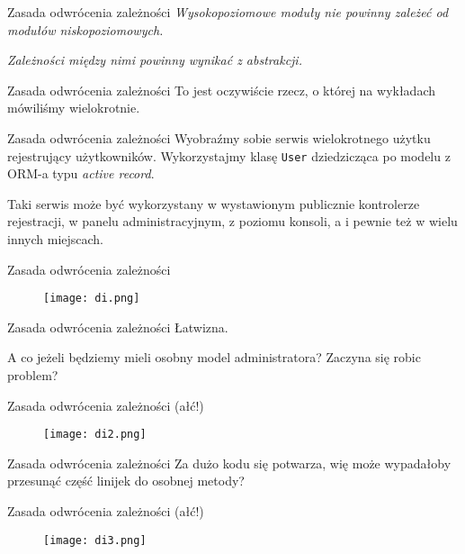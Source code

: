 \begin{frame}{Zasada odwrócenia zależności}
	\emph{Wysokopoziomowe moduły nie powinny zależeć od modułów niskopoziomowych.}
	
	\emph{Zależności między nimi powinny wynikać z abstrakcji.}
\end{frame}

\begin{frame}{Zasada odwrócenia zależności}
	To jest oczywiście rzecz, o której na wykładach mówiliśmy wielokrotnie.
\end{frame}

\begin{frame}{Zasada odwrócenia zależności}
	Wyobraźmy sobie serwis wielokrotnego użytku rejestrujący użytkowników. Wykorzystajmy klasę \texttt{User} dziedzicząca po modelu z ORM-a typu \emph{active record}.
	
	Taki serwis może być wykorzystany w wystawionym publicznie kontrolerze rejestracji, w panelu administracyjnym, z poziomu konsoli, a i pewnie też w wielu innych miejscach.
\end{frame}

\begin{frame}{Zasada odwrócenia zależności}
	\begin{figure} \centering
		\texttt{[image: di.png]}
	\end{figure}
\end{frame}

\begin{frame}{Zasada odwrócenia zależności}
	Łatwizna.
	
	A co jeżeli będziemy mieli osobny model administratora? Zaczyna się robic problem?
\end{frame}

\begin{frame}{Zasada odwrócenia zależności (ałć!)}
	\begin{figure} \centering
		\texttt{[image: di2.png]}
	\end{figure}
\end{frame}

\begin{frame}{Zasada odwrócenia zależności}
	Za dużo kodu się potwarza, wię może wypadałoby przesunąć część linijek do osobnej metody?
\end{frame}

\begin{frame}{Zasada odwrócenia zależności (ałć!)}
	\begin{figure} \centering
		\texttt{[image: di3.png]}
	\end{figure}
\end{frame}

